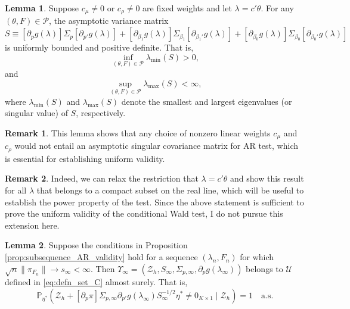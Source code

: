 \documentclass[11pt]{article}
\theoremstyle{definition}
\newtheorem{lemma}{Lemma}[section]
\newtheorem{remark}{Remark}[section]
\newcommand{\Prob}{\ensuremath{\mathbb{P}}} %
\newcommand{\0}{\ensuremath{\mathbf{0}}}
\begin{document}
\begin{bibunit}
%
\begin{lemma}
\label{lem:pd_variance}
Suppose $c_\mu \neq 0$ or $c_\rho \neq 0$ are fixed weights and let $\lambda = c'\theta$. For any $(\theta,F)\in\mathcal{P}$, the asymptotic variance matrix 
\[
    S \equiv [\partial_p g(\lambda)]\Sigma_p[\partial_{p'} g(\lambda)] + [\partial_{\beta_1} g(\lambda)]\Sigma_{\beta_1}[\partial_{\beta_1'} g(\lambda)] + [\partial_{\beta_0} g(\lambda)]\Sigma_{\beta_0}[\partial_{\beta_0'} g(\lambda)]
\]
is uniformly bounded and positive definite. That is, 
\begin{equation}
\label{eq:bdd_above_zero}
    \inf_{(\theta,F)\in \mathcal{P}} \lambda_{\min}(S) > 0,
\end{equation}
and 
\begin{equation}
\label{eq:bdd_below_inf}
    \sup_{(\theta,F)\in \mathcal{P}} \lambda_{\max}(S) < \infty,
\end{equation}
where $\lambda_{\min}(S)$ and $\lambda_{\max}(S)$ denote the smallest and largest eigenvalues (or singular value) of $S$, respectively.
\end{lemma}
\begin{remark}
This lemma shows that any choice of nonzero linear weights $c_\mu$ and $c_\rho$ would not entail an asymptotic singular covariance matrix for AR test, which is essential for establishing uniform validity.
\end{remark}
\begin{remark}
Indeed, we can relax the restriction that $\lambda = c'\theta$ and show this result for all $\lambda$ that belongs to a compact subset on the real line, which will be useful to establish the power property of the test. Since the above statement is sufficient to prove the uniform validity of the conditional Wald test, I do not pursue this extension here.
\end{remark}
%
\begin{lemma}
\label{lem:NS_cond}
    Suppose the conditions in Proposition \ref{prop:subsequence_AR_validity} hold for a sequence $(\lambda_n, F_n)$ for which $\sqrt{n}\|\pi_{F_{n}}\| \to s_\infty < \infty$. Then $\Upsilon_\infty = (\mathcal{Z}_h, S_\infty, \Sigma_{p,\infty}, \partial_p g(\lambda_\infty))$ belongs to $\mathcal{U}$ defined in \eqref{eq:defn_set_C} almost surely. That is, 
    \[
        \Prob_{\eta^*}\left(\mathcal{Z}_h + [\partial_p \pi] \Sigma_{p,\infty} \partial_{p'} g(\lambda_\infty) S_\infty^{-1/2}\eta^* \neq 0_{K\times 1} \mid \mathcal{Z}_h \right) = 1 \quad \text{a.s.}
    \]
\end{lemma}




\end{bibunit}
\end{document}
